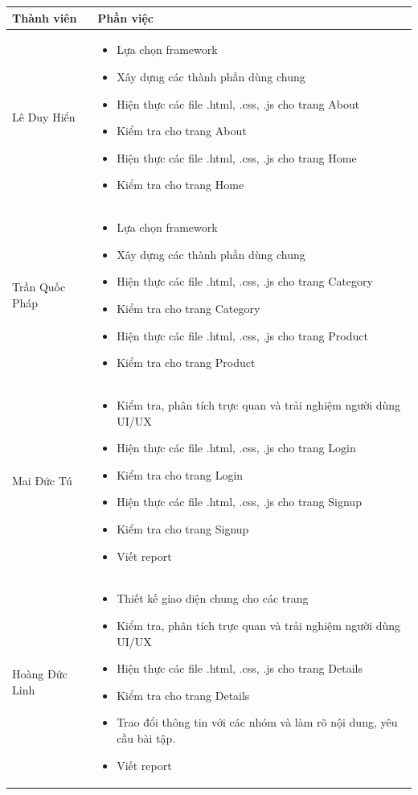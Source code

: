 \documentclass[a4paper]{article}
\begin{document}
\begin{tabu} to 0.7
\hline
 \textbf{Thành viên}& \textbf{Phần việc}\\
\hline
Lê Duy Hiển & \begin{itemize}
\item Lựa chọn framework
\item Xây dựng các thành phần dùng chung
\item Hiện thực các file .html, .css, .js cho trang About
\item Kiểm tra cho trang About
\item Hiện thực các file .html, .css, .js cho trang Home
\item Kiểm tra cho trang Home
\end{itemize}\\

\hline
Trần Quốc Pháp & \begin{itemize}
\item Lựa chọn framework
\item Xây dựng các thành phần dùng chung
\item Hiện thực các file .html, .css, .js cho trang Category
\item Kiểm tra cho trang Category
\item Hiện thực các file .html, .css, .js cho trang Product
\item Kiểm tra cho trang Product
\end{itemize}\\

\hline
Mai Đức Tú & \begin{itemize}
\item Kiểm tra, phân tích trực quan và trải nghiệm người dùng UI/UX
\item Hiện thực các file .html, .css, .js cho trang Login
\item Kiểm tra cho trang Login
\item Hiện thực các file .html, .css, .js cho trang Signup
\item Kiểm tra cho trang Signup
\item Viết report
\end{itemize}\\


\hline
Hoàng Đức Linh & \begin{itemize}
\item Thiết kế giao diện chung cho các trang
\item Kiểm tra, phân tích trực quan và trải nghiệm người dùng UI/UX
\item Hiện thực các file .html, .css, .js cho trang Details
\item Kiểm tra cho trang Details
\item Trao đổi thông tin với các nhóm và làm rõ nội dung, yêu cầu bài tập.
\item Viết report
\end{itemize}
\\
\hline
\end{tabu}
\end{document}
